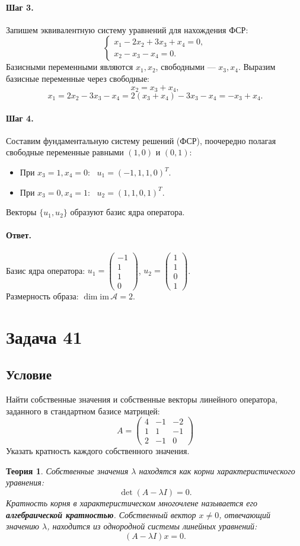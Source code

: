 \documentclass[12pt,a4paper]{article}
\theoremstyle{solution}
\newtheorem*{theory}{Теория}
\newcommand{\task}[1]{\newpage\section*{Задача #1}}
\newcommand{\answer}{\paragraph{Ответ.}}
\newcommand{\step}[1]{\paragraph{Шаг #1.}}
\begin{document}
\step{3} Запишем эквивалентную систему уравнений для нахождения ФСР:
\[
\begin{cases}
x_1 - 2x_2 + 3x_3 + x_4 = 0, \\
x_2 - x_3 - x_4 = 0.
\end{cases}
\]
Базисными переменными являются $x_1, x_2$, свободными — $x_3, x_4$. Выразим базисные переменные через свободные:
\[
x_2 = x_3 + x_4,
\]
\[
x_1 = 2x_2 - 3x_3 - x_4 = 2(x_3 + x_4) - 3x_3 - x_4 = -x_3 + x_4.
\]

\step{4} Составим фундаментальную систему решений (ФСР), поочередно полагая свободные переменные равными $(1, 0)$ и $(0, 1)$:
\begin{itemize}
    \item При $x_3 = 1, x_4 = 0$: \ $u_1 = (-1, 1, 1, 0)^T$.
    \item При $x_3 = 0, x_4 = 1$: \ $u_2 = (1, 1, 0, 1)^T$.
\end{itemize}
Векторы $\{u_1, u_2\}$ образуют базис ядра оператора.

\answer
Базис ядра оператора: $u_1 = \begin{pmatrix} -1 \\ 1 \\ 1 \\ 0 \end{pmatrix}$, $u_2 = \begin{pmatrix} 1 \\ 1 \\ 0 \\ 1 \end{pmatrix}$.\\
Размерность образа: $\dim \mathrm{im}\,\mathcal{A} = 2$.

\task{41}
\subsection*{Условие}
Найти собственные значения и собственные векторы линейного оператора, заданного в стандартном базисе матрицей:
\[
A = \begin{pmatrix} 4 & -1 & -2 \\ 1 & 1 & -1 \\ 2 & -1 & 0 \end{pmatrix}
\]
Указать кратность каждого собственного значения.

\begin{theory}
Собственные значения $\lambda$ находятся как корни характеристического уравнения:
\[
\det(A - \lambda I) = 0.
\]
Кратность корня в характеристическом многочлене называется его \textbf{алгебраической кратностью}. Собственный вектор $x \neq 0$, отвечающий значению $\lambda$, находится из однородной системы линейных уравнений:
\[
(A - \lambda I)x = 0.
\]
\end{theory}
\end{document}
